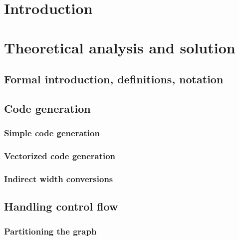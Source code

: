 \chapter{Introduction}
  
\chapter{Theoretical analysis and solution}

    \label{ch:analysis}

    \section{Formal introduction, definitions, notation} 

    \section{Code generation} 


        \subsection{Simple code generation}  %

        \subsection{Vectorized code generation} 

        \subsection{Indirect width conversions} 

    \section{Handling control flow} 

        \subsection{Partitioning the graph} 


